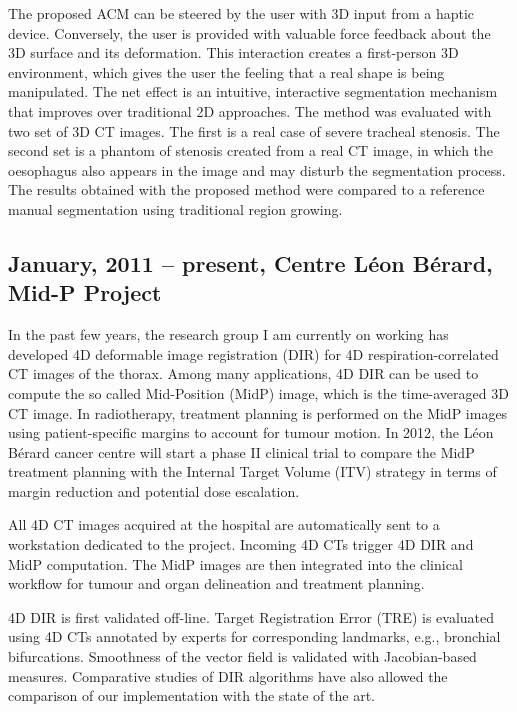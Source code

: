 \documentclass[a4paper]{article}
\begin{document}
The proposed ACM can be steered by the user with 3D input from a haptic device. Conversely, the user is provided with valuable force feedback about the 3D surface and its deformation. This interaction creates a first-person 3D environment, which gives the user the feeling that a real shape is being manipulated. The net effect is an intuitive, interactive segmentation mechanism that improves over traditional 2D approaches. The method was evaluated with two set of 3D CT images. The first is a real case of severe tracheal stenosis. The second set is a phantom of stenosis created from a real CT image, in which the oesophagus also appears in the image and may disturb the segmentation process. The results obtained with the proposed method were compared to a reference manual segmentation using traditional region growing.

\renewcommand{\refname}{Related publications}
\begin{bibunit}[unsrt]
\nocite{Pinho:Trachea7}
\putbib[mybib]
\end{bibunit}


\subsection{January, 2011 -- present, Centre L\'eon B\'erard, Mid-P Project}

In the past few years, the research group I am currently on working has developed 4D deformable image registration (DIR) for 4D respiration-correlated CT images of the thorax. Among many applications, 4D DIR can be used to compute the so called Mid-Position (MidP) image, which is the time-averaged 3D CT image. In radiotherapy, treatment planning is performed on the MidP images using patient-specific margins to account for tumour motion. In 2012, the L\'eon B\'erard cancer centre will start a phase II clinical trial to compare the MidP treatment planning with the Internal Target Volume (ITV) strategy in terms of margin reduction and potential dose escalation. 

All 4D CT images acquired at the hospital are automatically sent to a workstation dedicated to the project. Incoming 4D CTs trigger 4D DIR and MidP computation. The MidP images are then integrated into the clinical workflow for tumour and organ delineation and treatment planning. 

4D DIR is first validated off-line. Target Registration Error (TRE) is evaluated using 4D CTs annotated by experts for corresponding landmarks, e.g., bronchial bifurcations. Smoothness of the vector field is  validated with Jacobian-based measures. Comparative studies of DIR algorithms have also allowed the comparison of our implementation with the state of the art.
\end{document}
